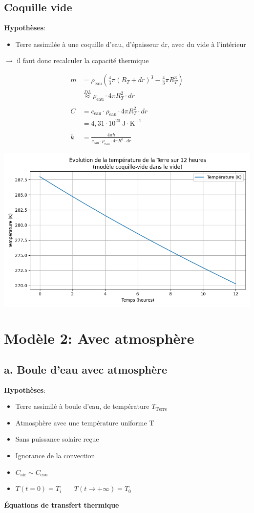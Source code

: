 \documentclass[a4paper,12pt]{article}
\begin{document}
\subsection{Coquille vide }
\textbf{Hypothèses}:
\begin{itemize}
    \item Terre assimilée à une coquille d'eau, d'épaisseur dr, avec du vide à l'intérieur
    
\end{itemize}
$\rightarrow$ il faut donc recalculer la capacité thermique 


\begin{align*}
m &= \rho_{\text{eau}} \left( \frac{4}{3} \pi (R_T + dr)^3 - \frac{4}{3} \pi R_T^3 \right) \\
&\overset{DL}{\approx} \rho_{\text{eau}} \cdot 4\pi R_T^2 \cdot dr \\
\\
C &= c_{\text{eau}} \cdot \rho_{\text{eau}} \cdot 4\pi R_T^2 \cdot dr \\
&= 4{,}31 \cdot 10^{20} \ \text{J} \cdot \text{K}^{-1} \\
\\
k &= \frac{4\pi h }{c_{\text{eau}} \cdot \rho_{\text{eau}} \cdot 4\pi R^2 \cdot dr}
\end{align*}

    \includegraphics[width=0.8\linewidth]{../modele1/figures/modele1_coquille.png} 


\section{Modèle 2: Avec atmosphère}
\subsection{a. Boule d'eau avec atmosphère }
\textbf{Hypothèses}:
\begin{itemize}
    \item Terre assimilé à boule d'eau, de température \(T_{\text{Terre}}\) 
    \item  Atmosphère avec une température uniforme T 
    \item  Sans puissance solaire reçue  
    \item  Ignorance de la convection  
    \item \(C_{\text{air}}\sim C_{\text{eau}}\) 
    \item $T(t=0) = T_i$ \ \ \
$T(t \to +\infty) = T_0$
   
\end{itemize}
\textbf{Équations de transfert thermique}
\end{document}

